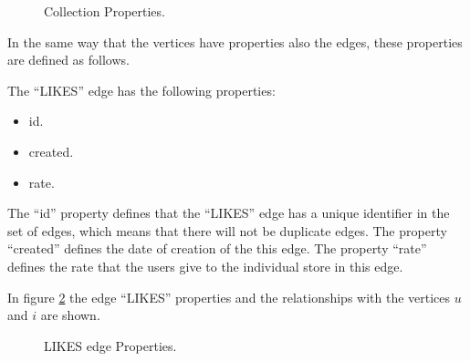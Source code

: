 \begin{figure}
\captionsetup{justification=centering,margin=2cm}
\centering
\setlength\fboxsep{0pt}
\setlength\fboxrule{0.7pt}
\caption{Collection Properties.}
\label{fig:Collection_node}
\end{figure}

In the same way that the vertices have properties also the edges, these
properties are defined as follows.

The “LIKES” edge has the following properties:

\begin{itemize}
\item id.
\item created.
\item rate.
\end{itemize}

The “id” property defines that the “LIKES” edge has a unique identifier in the
set of edges, which means that there will not be duplicate edges. The property
“created” defines the date of creation of the this edge. The property “rate”
defines the rate that the users give to the individual store in this edge.

In figure \ref{fig:Likes_edge} the edge “LIKES” properties and the relationships
with the vertices $u$ and $i$ are shown.


\begin{figure}
\captionsetup{justification=centering,margin=2cm}
\centering
\setlength\fboxsep{0pt}
\setlength\fboxrule{0.7pt}
\caption{LIKES edge Properties.}
\label{fig:Likes_edge}
\end{figure}

